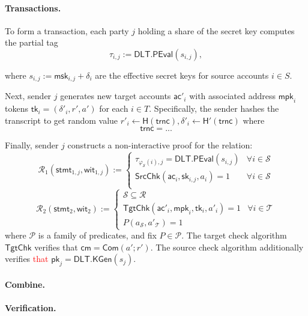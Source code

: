 \paragraph{Transactions.}
To form a transaction, each party $j$ holding a share of the secret key computes the partial tag
    \[
        \tau_{i,j} := \mathsf{DLT.PEval}(s_{i,j}),
    \]
   
where $s_{i,j} := \mathsf{msk}_{i,j} + \delta_i$ are the effective secret keys for source accounts $i \in S$. 

Next, sender $j$ generates new target accounts $\mathsf{ac}'_i$ with associated address $\mathsf{mpk}_i$ tokens $\mathsf{tk}_i= (\delta'_i, r', a')$ for each $i \in T$. Specifically, the sender hashes the transcript to get random value $r'_i \leftarrow \mathsf{H(trnc)},\delta'_i \leftarrow \mathsf{H'(trnc)}$ where
\[
\mathsf{trnc}=...
\]


Finally, sender $j$ constructs a non-interactive proof for the relation:
\[
\mathcal{R}_1(\mathsf{stmt}_{1,j}, \mathsf{wit}_{1,j}) := 
\begin{cases}
\tau_{\varphi_{\mathcal{S}}(i),j} = \mathsf{DLT.PEval}(s_{i,j}) & \forall i \in \mathcal{S} \\[4pt]
\mathsf{SrcChk}(\mathsf{ac}_i, \mathsf{sk}_{i,j}, a_i) = 1 & \forall i \in \mathcal{S} \\[4pt]
\end{cases}
\]
\[
\mathcal{R}_2(\mathsf{stmt}_{2}, \mathsf{wit}_{2}) := 
\begin{cases}
\mathcal{S} \subseteq \mathcal{R} \\[4pt]
\mathsf{TgtChk}(\mathsf{ac}'_i, \mathsf{mpk}_i, \mathsf{tk}_i, a'_i) = 1 & \forall i \in \mathcal{T} \\[4pt]
P(a_{\mathcal{S}}, a'_{\mathcal{T}}) = 1
\end{cases}
\]
where $\mathcal{P}$ is a family of predicates, and fix $P \in \mathcal{P}$. The target check algorithm $\mathsf{TgtChk}$ verifies that $\mathsf{cm} = \mathsf{Com}(a'; r')$. The {source check algorithm} additionally verifies \textcolor{red}{that} $\mathsf{pk}_j = \mathsf{DLT.KGen}(s_j)$.

\paragraph{Combine.}

\paragraph{Verification.}



